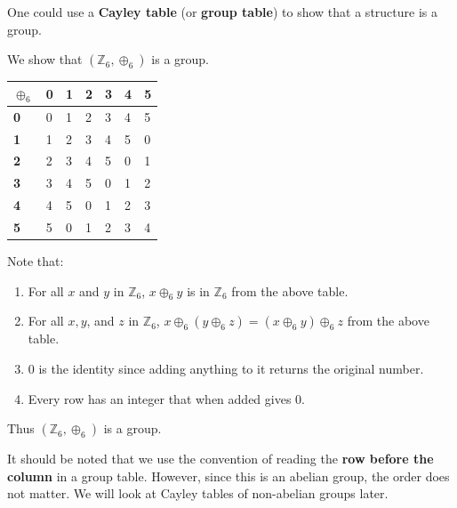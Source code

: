 One could use a \textbf{Cayley table} (or \textbf{group table}) to show that a structure is a group.
\begin{example}
    We show that $(\mathbb{Z}_6, \oplus_6)$ is a group.
    \begin{table}[h]
        \centering
        \begin{tabular}{|l|l|l|l|l|l|l|}
        \hline
        \textbf{$\oplus_6$} & \textbf{0} & \textbf{1} & \textbf{2} & \textbf{3} & \textbf{4} & \textbf{5} \\ \hline
        \textbf{0}      & 0          & 1          & 2          & 3          & 4          & 5          \\ \hline
        \textbf{1}      & 1          & 2          & 3          & 4          & 5          & 0          \\ \hline
        \textbf{2}      & 2          & 3          & 4          & 5          & 0          & 1          \\ \hline
        \textbf{3}      & 3          & 4          & 5          & 0          & 1          & 2          \\ \hline
        \textbf{4}      & 4          & 5          & 0          & 1          & 2          & 3          \\ \hline
        \textbf{5}      & 5          & 0          & 1          & 2          & 3          & 4          \\ \hline
        \end{tabular}
    \end{table}
    Note that:
    \begin{enumerate}
        \item For all $x$ and $y$ in $\mathbb{Z}_6$, $x \oplus_6 y$ is in $\mathbb{Z}_6$ from the above table.
        \item For all $x, y$, and $z$ in $\mathbb{Z}_6$, $x \oplus_6 (y \oplus_6 z) = (x \oplus_6 y) \oplus_6 z$ from the above table.
        \item 0 is the identity since adding anything to it returns the original number.
        \item Every row has an integer that when added gives 0.
    \end{enumerate}
    Thus $(\mathbb{Z}_6, \oplus_6)$ is a group.
\end{example}

It should be noted that we use the convention of reading the \textbf{row before the column} in a group table. However, since this is an abelian group, the order does not matter. We will look at Cayley tables of non-abelian groups later.

